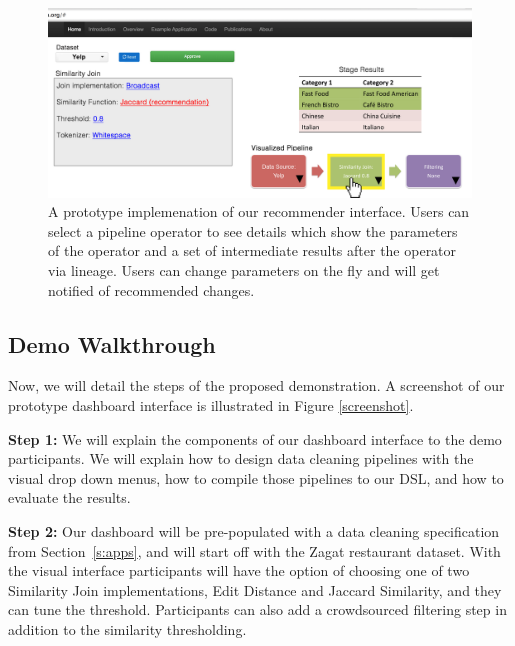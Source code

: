 \begin{figure}[t]
\centering
 \includegraphics[width=\columnwidth]{figs/dashboard_recsys.png}
 \caption{A prototype implemenation of our \sys recommender interface. Users can select a pipeline operator to see details which show the parameters of the operator and a set of intermediate results after the operator via lineage. Users can change parameters on the fly and will get notified of recommended changes. \label{screenshot-rec}}\vspace{-1.75em}
\end{figure}

\subsection{Demo Walkthrough}
Now, we will detail the steps of the proposed demonstration.
A screenshot of our prototype dashboard interface is illustrated in Figure \ref{screenshot}.

\vspace{0.5em}

\noindent\textbf{Step 1: } We will explain the components of our dashboard interface to the
demo participants. We will explain how to design data cleaning pipelines with the visual 
drop down menus, how to compile those pipelines to our DSL, and how to evaluate the results.

\vspace{0.5em}

\noindent\textbf{Step 2: } Our dashboard will be pre-populated with a data cleaning specification from Section~\ref{s:apps}, and will
start off with the Zagat restaurant dataset. With the visual interface participants will have the option of choosing one of two Similarity Join implementations, Edit Distance and Jaccard Similarity, and they can tune the threshold.
Participants can also add a crowdsourced filtering step in addition to the similarity thresholding. 

